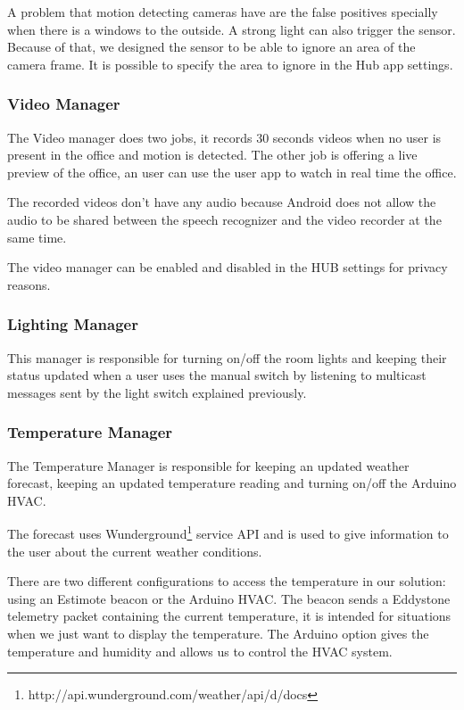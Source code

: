 A problem that motion detecting cameras have are the false positives specially when there is a windows to the outside. A strong light can also trigger the sensor. Because of that, we designed the sensor to be able to ignore an area of the camera frame. It is possible to specify the area to ignore in the Hub app settings.


\subsubsection{Video Manager}

The Video manager does two jobs, it records 30 seconds videos when no user is present in the office and motion is detected. The other job is offering a live preview of the office, an user can use the user app to watch in real time the office.

The recorded videos don't have any audio because Android does not allow the audio to be shared between the speech recognizer and the video recorder at the same time.

The video manager can be enabled and disabled in the HUB settings for privacy reasons.



\subsubsection{Lighting Manager}

This manager is responsible for turning on/off the room lights and keeping their status updated when a user uses the manual switch by listening to multicast messages sent by the light switch explained previously. 






\subsubsection{Temperature Manager}\label{temperature_manager_imp}


The Temperature Manager is responsible for keeping an updated weather forecast, keeping an updated temperature reading and turning on/off the Arduino \ac{HVAC}.

The forecast uses Wunderground\footnote{http://api.wunderground.com/weather/api/d/docs} service API and is used to give information to the user about the current weather conditions.

There are two different configurations to access the temperature in our solution: using an Estimote beacon or the Arduino \ac{HVAC}. 
The beacon sends a Eddystone telemetry packet containing the current temperature, it is intended for situations when we just want to display the temperature.
The Arduino option gives the temperature and humidity and allows us to control the \ac{HVAC} system.


